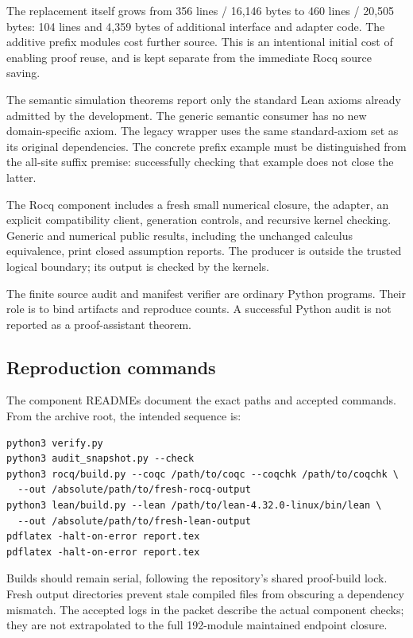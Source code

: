 \documentclass[11pt,letterpaper]{article}
\theoremstyle{definition}\newtheorem{definition}[theorem]{Definition}
\theoremstyle{remark}\newtheorem{remark}[theorem]{Remark}
\newcommand{\code}[1]{\texttt{\detokenize{#1}}}
\begin{document}
The \code{KSim} replacement itself grows from 356 lines / 16,146 bytes to 460 lines / 20,505 bytes: 104 lines and 4,359 bytes of additional interface and adapter code. The additive prefix modules cost further source. This is an intentional initial cost of enabling proof reuse, and is kept separate from the immediate Rocq source saving.

The semantic simulation theorems report only the standard Lean axioms already admitted by the development. The generic semantic consumer has no new domain-specific axiom. The legacy wrapper uses the same standard-axiom set as its original dependencies. The concrete prefix example must be distinguished from the all-site suffix premise: successfully checking that example does not close the latter.

The Rocq component includes a fresh small numerical closure, the adapter, an explicit compatibility client, generation controls, and recursive kernel checking. Generic and numerical public results, including the unchanged calculus equivalence, print closed assumption reports. The producer is outside the trusted logical boundary; its output is checked by the kernels.

The finite source audit and manifest verifier are ordinary Python programs. Their role is to bind artifacts and reproduce counts. A successful Python audit is not reported as a proof-assistant theorem.

\subsection{Reproduction commands}

The component READMEs document the exact paths and accepted commands. From the archive root, the intended sequence is:
\begin{lstlisting}
python3 verify.py
python3 audit_snapshot.py --check
python3 rocq/build.py --coqc /path/to/coqc --coqchk /path/to/coqchk \
  --out /absolute/path/to/fresh-rocq-output
python3 lean/build.py --lean /path/to/lean-4.32.0-linux/bin/lean \
  --out /absolute/path/to/fresh-lean-output
pdflatex -halt-on-error report.tex
pdflatex -halt-on-error report.tex
\end{lstlisting}

Builds should remain serial, following the repository's shared proof-build lock. Fresh output directories prevent stale compiled files from obscuring a dependency mismatch. The accepted logs in the packet describe the actual component checks; they are not extrapolated to the full 192-module maintained endpoint closure.
\end{document}
